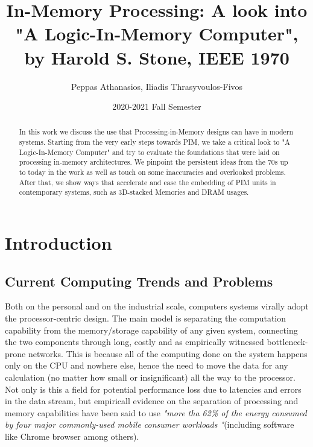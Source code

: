 \documentclass[12pt,twocolumn]{IEEEtran}
\title{In-Memory Processing: A look into "A Logic-In-Memory Computer", by Harold S. Stone, IEEE 1970}
\date{2020-2021 Fall Semester}
\author{Peppas Athanasios, Iliadis Thrasyvoulos-Fivos}
\begin{document}
  \maketitle

\begin{abstract}
In this work we discuss the use that Processing-in-Memory designs can have in modern systems. Starting from the very early steps towards PIM, we take a critical look to "A Logic-In-Memory Computer" and try to evaluate the foundations that were laid on processing in-memory architectures. We pinpoint the persistent ideas from the 70s up to today in the work as well as touch on some inaccuracies and overlooked problems. After that, we show ways that accelerate and ease the embedding of PIM units in contemporary systems, such as 3D-stacked Memories and DRAM usages.
\end{abstract}

\section{Introduction}

\subsection{Current Computing Trends and Problems}
Both on the personal and on the industrial scale, computers systems virally adopt the processor-centric design. The main model is separating the computation capability from the memory/storage capability of any given system, connecting the two components through long, costly and as empirically witnessed bottleneck-prone networks. This is because all of the computing done on the system happens only on the CPU and nowhere else, hence the need to move the data for any calculation (no matter how small or insignificant) all the way to the processor. Not only is this a field for potential performance loss due to latencies and errors in the data stream, but empiricall evidence on the separation of processing and memory capabilities have been said to use \textit{"more tha 62\% of the energy consumed by four major commonly-used mobile consumer workloads "}(including software like Chrome browser among others)\cite{PAPER:1}.
\end{document}
